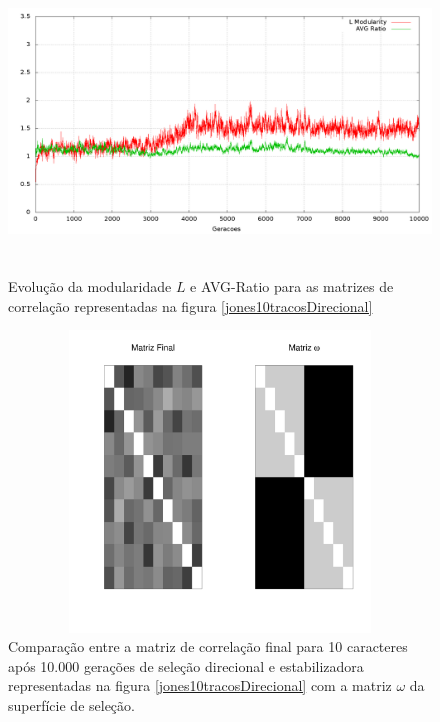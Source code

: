\begin{figure}[htbp]
  \centering
  \includegraphics[width=150mm, height=80mm]{figuras/jones10tracosDirecionalStats.png}
  \caption{Evolução da modularidade $L$ e AVG-Ratio para as matrizes de
  correlação representadas na figura \ref{jones10tracosDirecional}}
  \label{jones10tracosDirecionalStats}
\end{figure}



\begin{figure}[htbp]
  \centering
  \includegraphics[width=150mm, height=80mm]{figuras/Mat10tracosDirecional}
   \caption{Comparação entre a matriz de correlação final para 10 caracteres
   após 10.000 gerações de seleção direcional e estabilizadora
   representadas na figura \ref{jones10tracosDirecional} com a matriz
   $\omega$ da superfície de seleção.}
  \label{MatJones10tracosDirecional}
\end{figure}


